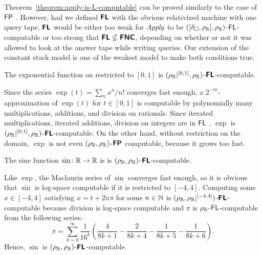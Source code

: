\documentclass[envcountsame,orivec,oribibl]{llncs}
\begin{document}
Theorem~\ref{theorem:apply-is-L-computable} can be proved 
similarly to the case of $\mathsf{FP}$ 
\cite{kawamura11:_funct_space_repres_and_polyn_time_comput}. 
However, 
had we defined $\text{\bfseries \sffamily \upshape FL}$ with the obvious relativized machine with one query tape,
$\text{\bfseries \sffamily \upshape FL}$ would be either too weak 
for $\mathit{Apply}$ to be $([\delta _\square,\rho _\mathbb R], \rho _\mathbb R)$-$\mathsf{FL}$-computable or
too strong that $\text{\bfseries \sffamily \upshape FL} \nsubseteq \text{\bfseries \sffamily \upshape FNC}$,
depending on whether or not it was allowed to look at the answer tape while writing queries.
Our extension of the constant stack model is one of the weakest model
to make both conditions true.


\begin{lemma}
 The exponential function on restricted to $[0,1]$
 is $(\rho _\mathbb R|^{[0,1]}, \rho _\mathbb R)$-$\text{\bfseries \sffamily \upshape FL}$-computable.
\end{lemma}
Since the series $\exp(t) = \sum_n x^n / n!$ converges fast enough,
a $2^{-m}$-approximation of $\exp(t)$ for $t \in [0,1]$ is computable 
by polynomially many multiplications, additions, and division on rationals.
Since iterated multiplications, iterated additions, division on integers
are in $\mathsf{FL}$ \cite{chiu2001division},
$\exp$ is $(\rho _\mathbb R|^{[0,1]}, \rho _\mathbb R)$-$\text{\bfseries \sffamily \upshape FL}$-computable.
On the other hand, without restriction on the domain, $\exp$ is not 
even $(\rho _\mathbb R, \rho _\mathbb R)$-$\text{\bfseries \sffamily \upshape FP}$ computable, 
because it grows too fast. 

\begin{lemma}
  The sine function $\sin \colon \mathbb R \to \mathbb R$ is
 is $(\rho _\mathbb R, \rho _\mathbb R)$-$\text{\bfseries \sffamily \upshape FL}$-computable.
\end{lemma}
Like $\exp$, the Maclaurin series of $\sin$ converges fast enough,
so it is obvious that $\sin$ is log-space computable if it is restricted to $[-4, 4]$.
Computing some $x \in [-4, 4]$ satisfying $x = t + 2n\pi$ for 
some $n \in \mathbb N$ is
$(\rho _\mathbb R, \rho _\mathbb R|^{[-4,4]})$-$\text{\bfseries \sffamily \upshape FL}$-computable because division is log-space computable and $\pi$ is $\rho _\mathbb R$-$\mathsf{FL}$-computable from the following series:
\begin{equation}
 \pi = \sum_{k=0}^\infty \frac{1}{16^k} 
  \left( \frac{4}{8k+1} - \frac{2}{8k+4} - \frac{1}{8k+5} - \frac{1}{8k+6} \right).
\end{equation}
Hence, $\sin$ is $(\rho _\mathbb R, \rho _\mathbb R)$-$\text{\bfseries \sffamily \upshape FL}$-computable.
\end{document}
